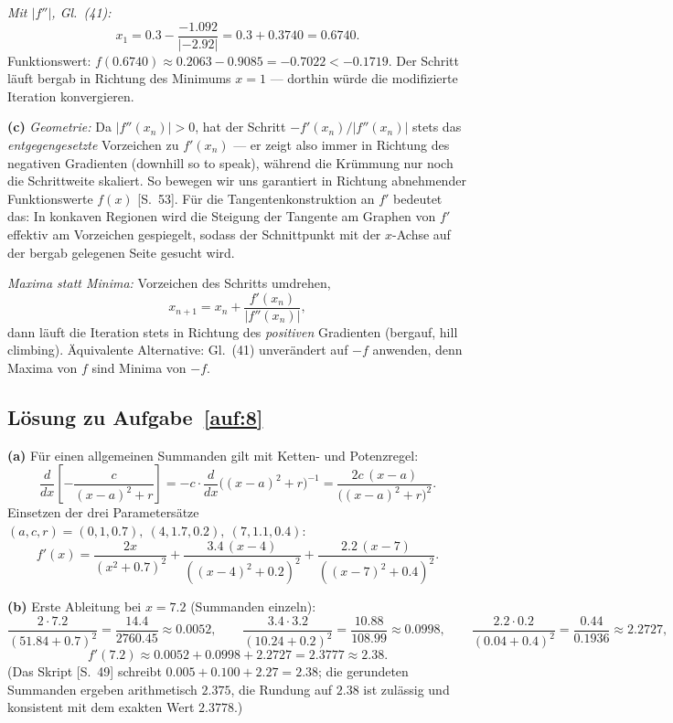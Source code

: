 \documentclass[a4paper,11pt]{scrartcl}
\begin{document}
\emph{Mit $|f''|$, Gl.~(41):}
\[
  x_1 = 0.3 - \frac{-1.092}{|-2.92|} = 0.3 + 0.3740 = 0.6740.
\]
Funktionswert: $f(0.6740) \approx 0.2063 - 0.9085 = -0.7022 < -0.1719$. Der Schritt
läuft bergab in Richtung des Minimums $x = 1$ --- dorthin würde die modifizierte
Iteration konvergieren.

\textbf{(c)} \emph{Geometrie:} Da $|f''(x_n)| > 0$, hat der Schritt
$-f'(x_n)/|f''(x_n)|$ stets das \emph{entgegengesetzte} Vorzeichen zu $f'(x_n)$ --- er
zeigt also immer in Richtung des negativen Gradienten (\glqq downhill so to speak\grqq),
während die Krümmung nur noch die Schrittweite skaliert. So bewegen wir uns garantiert in
Richtung abnehmender Funktionswerte $f(x)$ [S.~53]. Für die Tangentenkonstruktion an
$f'$ bedeutet das: In konkaven Regionen wird die Steigung der Tangente am Graphen von
$f'$ effektiv am Vorzeichen gespiegelt, sodass der Schnittpunkt mit der $x$-Achse auf der
bergab gelegenen Seite gesucht wird.

\emph{Maxima statt Minima:} Vorzeichen des Schritts umdrehen,
\[
  x_{n+1} = x_n + \frac{f'(x_n)}{|f''(x_n)|},
\]
dann läuft die Iteration stets in Richtung des \emph{positiven} Gradienten (bergauf,
hill climbing). Äquivalente Alternative: Gl.~(41) unverändert auf $-f$ anwenden, denn
Maxima von $f$ sind Minima von $-f$.

\subsection*{Lösung zu Aufgabe~\ref{auf:8}}

\textbf{(a)} Für einen allgemeinen Summanden gilt mit Ketten- und Potenzregel:
\[
  \frac{d}{dx}\left[-\frac{c}{(x-a)^2 + r}\right]
  = -c \cdot \frac{d}{dx}\bigl((x-a)^2 + r\bigr)^{-1}
  = \frac{2c\,(x-a)}{\bigl((x-a)^2 + r\bigr)^2}.
\]
Einsetzen der drei Parametersätze $(a, c, r) = (0, 1, 0.7),\ (4, 1.7, 0.2),\ (7, 1.1, 0.4)$:
\[
  f'(x) = \frac{2x}{(x^2 + 0.7)^2}
        + \frac{3.4\,(x-4)}{((x-4)^2 + 0.2)^2}
        + \frac{2.2\,(x-7)}{((x-7)^2 + 0.4)^2}.
\]

\textbf{(b)} Erste Ableitung bei $x = 7.2$ (Summanden einzeln):
\[
  \frac{2 \cdot 7.2}{(51.84 + 0.7)^2} = \frac{14.4}{2760.45} \approx 0.0052, \qquad
  \frac{3.4 \cdot 3.2}{(10.24 + 0.2)^2} = \frac{10.88}{108.99} \approx 0.0998, \qquad
  \frac{2.2 \cdot 0.2}{(0.04 + 0.4)^2} = \frac{0.44}{0.1936} \approx 2.2727,
\]
\[
  f'(7.2) \approx 0.0052 + 0.0998 + 2.2727 = 2.3777 \approx 2.38.
\]
(Das Skript [S.~49] schreibt $0.005 + 0.100 + 2.27 = 2.38$; die gerundeten Summanden
ergeben arithmetisch $2.375$, die Rundung auf $2.38$ ist zulässig und konsistent mit dem
exakten Wert $2.3778$.)
\end{document}

